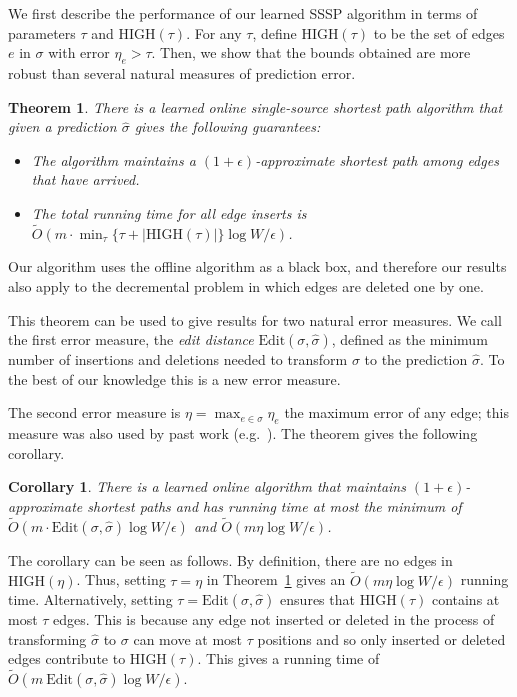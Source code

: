 \documentclass[11pt]{article}
\newtheorem{corollary}{Corollary}
\newtheorem{theorem}{Theorem}
\newcommand{\defn}{\emph}
\begin{document}
We first describe the performance of our learned SSSP algorithm in terms of parameters $\tau$ and $\text{HIGH}(\tau)$.  For any $\tau$, define $\text{HIGH}(\tau)$ to be the set of edges $e$ in $\sigma$ with error $\eta_e > \tau$. Then, we show that the bounds obtained are more robust than several natural measures of prediction error.  

\begin{theorem}\label{thm:online}
    There is a learned online single-source shortest path algorithm that given a prediction $\hat{\sigma}$ gives the following guarantees:
    \begin{itemize}[noitemsep, nolistsep]
        \item The algorithm maintains a $(1+\epsilon)$-approximate shortest path among edges that have arrived. 
        \item  The total running time for all edge inserts is
        $\tilde{O}(m \cdot \min_{\tau} \{\tau + |\text{HIGH}(\tau)| \} \log W/\epsilon)$.
    \end{itemize}
\end{theorem}

Our algorithm uses the offline algorithm as a black box, and therefore our results also apply to the decremental problem in which edges are deleted one by one.

This theorem can be used to give results for two natural error measures. 
We call the first error measure, the \defn{edit distance} $\text{Edit}(\sigma,\hat{\sigma})$, defined as the minimum number of insertions and deletions needed to transform $\sigma$ to the prediction $\hat{\sigma}$. To the best of our knowledge this is a new error measure.
  
The second error measure is  $ \eta = \max_{e \in \sigma} \eta_e $  the maximum error of any edge; this measure was also used by past work (e.g.~\cite{BrandFNP24, McCauleyMNS23, McCauleyMoNi24}).
The theorem gives the following corollary.

\begin{corollary}\label{cor:main}
There is a learned online algorithm that maintains $(1+\epsilon)$-approximate shortest paths and has running time at most the minimum of $\tilde{O}(m \cdot \text{Edit}(\sigma,\hat{\sigma}) \log W/\epsilon)$ and $\tilde{O}(m \eta \log W/\epsilon)$.
\end{corollary}
The corollary can be seen as follows. 
By definition, there are no edges in $\text{HIGH}(\eta)$.  Thus, setting $\tau = \eta$ in Theorem~\ref{thm:online}  gives an $\tilde{O}(m \eta \log W/\epsilon)$ running time.  Alternatively, setting $\tau = \text{Edit}(\sigma,\hat{\sigma})$  ensures that $\text{HIGH}(\tau)$
contains at most $\tau$ edges. This is because any edge not inserted or deleted in the process of transforming $\hat{\sigma}$ to $\sigma$ can move at most $\tau$ positions and so only inserted or deleted edges contribute to $\text{HIGH}(\tau)$.
This gives a running time of $\tilde{O}(m\ \text{Edit}(\sigma,\hat{\sigma}) \log W/\epsilon)$.
\end{document}
